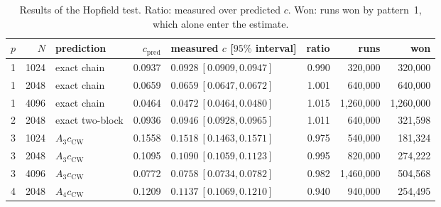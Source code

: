 \documentclass[final]{dynafront2026}
\begin{document}
\begin{table}[!htb]
 \centering
 \caption{Results of the Hopfield test. Ratio: measured over predicted $c$. Won: runs won by
 pattern~1, which alone enter the estimate.}
 \label{tab:transfer}
 \small
 \begin{tabular}{@{}rrlrlrrr@{}}
 \toprule
 $p$ & $N$ & prediction & $c_{\mathrm{pred}}$ & measured $c$ [$95\%$ interval] & ratio & runs & won\\
 \midrule
 1 & 1024 & exact chain & 0.0937 & $0.0928\ [0.0909,0.0947]$ & 0.990 & 320{,}000 & 320{,}000\\
 1 & 2048 & exact chain & 0.0659 & $0.0659\ [0.0647,0.0672]$ & 1.001 & 640{,}000 & 640{,}000\\
 1 & 4096 & exact chain & 0.0464 & $0.0472\ [0.0464,0.0480]$ & 1.015 & 1{,}260{,}000 & 1{,}260{,}000\\
 2 & 2048 & exact two-block & 0.0936 & $0.0946\ [0.0928,0.0965]$ & 1.011 & 640{,}000 & 321{,}598\\
 3 & 1024 & $A_3c_{\mathrm{CW}}$ & 0.1558 & $0.1518\ [0.1463,0.1571]$ & 0.975 & 540{,}000 & 181{,}324\\
 3 & 2048 & $A_3c_{\mathrm{CW}}$ & 0.1095 & $0.1090\ [0.1059,0.1123]$ & 0.995 & 820{,}000 & 274{,}222\\
 3 & 4096 & $A_3c_{\mathrm{CW}}$ & 0.0772 & $0.0758\ [0.0734,0.0782]$ & 0.982 & 1{,}460{,}000 & 504{,}568\\
 4 & 2048 & $A_4c_{\mathrm{CW}}$ & 0.1209 & $0.1137\ [0.1069,0.1210]$ & 0.940 & 940{,}000 & 254{,}495\\
 \bottomrule
 \end{tabular}
\end{table}
\end{document}
